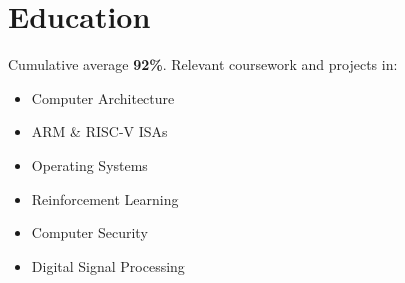 \documentclass{moderncv}
\begin{document}
\section{Education}
{
    Cumulative average \textbf{92\%}. Relevant coursework and projects in:\\
\begin{minipage}{0.3\textwidth}
\begin{itemize}
    \item Computer Architecture
    \item ARM \& RISC-V ISAs
\end{itemize}
\end{minipage}
\begin{minipage}{0.3\textwidth}
\begin{itemize}
    \item Operating Systems
    \item Reinforcement Learning
\end{itemize}
\end{minipage}
\begin{minipage}{0.3\textwidth}
\begin{itemize}
    \item Computer Security
    \item Digital Signal Processing
\end{itemize}
\end{minipage}
}
\end{document}
